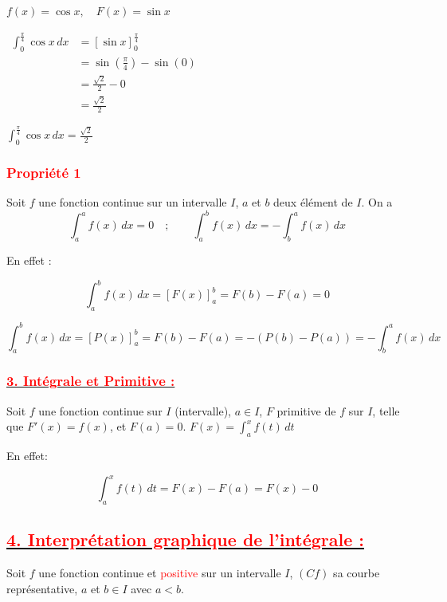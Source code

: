 \documentclass[12pt,a4paper]{article}
\begin{document}
\(
f(x) = \cos x, \quad F(x) = \sin x
\)

\(
\begin{aligned}
\int_0^{\frac{\pi}{4}} \cos x \, dx &= \left[ \sin x \right]_0^{\frac{\pi}{4}} \\
&= \sin \left( \frac{\pi}{4} \right) - \sin(0) \\
&= \frac{\sqrt{2}}{2} - 0 \\
&= \frac{\sqrt{2}}{2}
\end{aligned}
\)

\( \boxed{\int_0^{\frac{\pi}{4}} \cos x \, dx = \frac{\sqrt{2}}{2}} \)

\subsubsection*{\textbf{\textcolor{red}{Propriété 1 }}}
Soit \( f \) une fonction continue sur un intervalle \( I \), \( a \) et \( b \) deux élément de \( I \). On a
\[
\int_a^a f(x) \, dx = 0 \quad;\quad \quad \int_a^b f(x) \, dx = - \int_b^a f(x) \, dx
\]

En effet :

\[
\int_a^b f(x) \, dx = \left[ F(x) \right]_a^b = F(b) - F(a) = 0
\]

\[
\int_a^b f(x) \, dx = \left[ P(x) \right]_a^b = F(b) - F(a) = - \left( P(b) - P(a) \right)=-\int_b^a f(x) \, dx
\]

\subsubsection*{\underline{\textbf{\textcolor{red}{3. Intégrale et Primitive :}}}}

Soit \( f \) une fonction continue sur \( I \) (intervalle), \( a \in I \), \( F \) primitive de \( f \) sur \( I \), telle que \( F'(x) = f(x) \), et \( F(a) = 0 \). \(F(x) = \int_a^x f(t) \, dt \)

En effet:

\[
\int_a^x f(t) \, dt = F(x) - F(a) = F(x) - 0
\]

\subsection*{\underline{\textbf{\textcolor{red}{4. Interprétation graphique de l'intégrale :}}}}

Soit \( f \) une fonction continue et \textcolor{red}{positive} sur un intervalle \( I \), \( (Cf) \) sa courbe représentative, \( a \) et \( b \in I \) avec \( a < b \).
\end{document}
